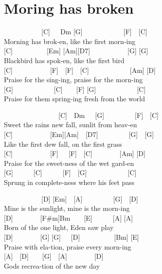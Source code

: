 \documentclass[
  letterpaper,
  a5paper]{memoir}
\begin{document}
\hypertarget{moring-has-broken}{%
\chapter{Moring has broken}\label{moring-has-broken}}

~~~~~~~~~~~{[}C{]}~~~Dm {[}G{]}~~~~~~~~~~~~{[}F{]}~~{[}C{]}\\
Morning has brok-en, like the first morn-ing\\
{[}C{]}~~~~~~~~~~{[}Em{]} {[}Am{]}{[}D7{]}~~~~~~~~~~~{[}G{]} {[}G{]}\\
Blackbird has spok-en, like the first bird\\
{[}C{]}~~~~~~~~~~~{[}F{]}~~{[}F{]}~~{[}C{]}~~~~~~~~~~~~{[}Am{]}
{[}D{]}\\
Praise for the sing-ing, praise for the morn-ing\\
{[}G{]}~~~~~~~~~~~~{[}C{]}~~~~{[}F{]} {[}G{]}~~~~~~~~~~~~{[}C{]}\\
Praise for them spring-ing fresh from the world

~~~~~~~~~~~~~~~~{[}C{]}~~Dm~~~{[}G{]}~~~~~~~~~{[}F{]}~~{[}C{]}\\
Sweet the rain\textquotesingle s new fall, sunlit from heav-en\\
{[}C{]}~~~~~~~~~~~{[}Em{]}{[}Am{]}~~{[}D7{]}~~~~~~~~~{[}G{]}~~{[}G{]}\\
Like the first dew fall, on the first grass\\
{[}C{]}~~~~~~~~~~~{[}F{]}~~~{[}F{]}~~{[}C{]}~~~~~~~~{[}Am{]} {[}D{]}\\
Praise for the sweet-ness of the wet gard-en\\
{[}G{]}~~~~~~{[}C{]}~~~~~~{[}F{]}~~{[}G{]}~~~~~~~~~~~~{[}C{]}\\
Sprung in complete-ness where his feet pass

~~~~~~~~~~~{[}D{]} {[}Em{]}~~{[}A{]}~~~~~~~~~{[}G{]}~~{[}D{]}\\
Mine is the sunlight, mine is the morn-ing\\
{[}D{]}~~~~~~~~{[}F\#m{]}Bm~~~~{[}E{]}~~~~~~{[}A{]} {[}A{]}\\
Born of the one light, Eden saw play\\
{[}D{]}~~~~~~~~{[}G{]} {[}G{]}~~~{[}D{]}~~~~~~~~~~{[}Bm{]} {[}E{]}\\
Praise with ela-tion, praise every morn-ing\\
{[}A{]}~~{[}D{]}~~~~{[}G{]}~~{[}A{]}~~~~~~~~{[}D{]}\\
God\textquotesingle s recrea-tion of the new day
\end{document}
